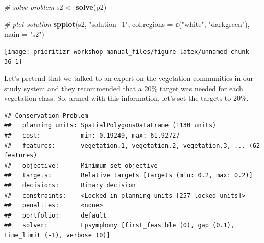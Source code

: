 \documentclass[12pt,]{book}
\newenvironment{Shaded}{\begin{snugshade}}{\end{snugshade}}
\newcommand{\KeywordTok}[1]{\textcolor[rgb]{0.13,0.29,0.53}{\textbf{#1}}}
\newcommand{\DataTypeTok}[1]{\textcolor[rgb]{0.13,0.29,0.53}{#1}}
\newcommand{\FloatTok}[1]{\textcolor[rgb]{0.00,0.00,0.81}{#1}}
\newcommand{\StringTok}[1]{\textcolor[rgb]{0.31,0.60,0.02}{#1}}
\newcommand{\CommentTok}[1]{\textcolor[rgb]{0.56,0.35,0.01}{\textit{#1}}}
\newcommand{\OtherTok}[1]{\textcolor[rgb]{0.56,0.35,0.01}{#1}}
\newcommand{\OperatorTok}[1]{\textcolor[rgb]{0.81,0.36,0.00}{\textbf{#1}}}
\newcommand{\NormalTok}[1]{#1}
\begin{document}
\begin{Shaded}
\begin{Highlighting}[]
\CommentTok{# solve problem}
\NormalTok{s2 <-}\StringTok{ }\KeywordTok{solve}\NormalTok{(p2)}

\CommentTok{# plot solution}
\KeywordTok{spplot}\NormalTok{(s2, }\StringTok{"solution_1"}\NormalTok{, }\DataTypeTok{col.regions =} \KeywordTok{c}\NormalTok{(}\StringTok{"white"}\NormalTok{, }\StringTok{"darkgreen"}\NormalTok{), }\DataTypeTok{main =} \StringTok{"s2"}\NormalTok{)}
\end{Highlighting}
\end{Shaded}

\begin{center}\texttt{[image: prioritizr-workshop-manual\_files/figure-latex/unnamed-chunk-36-1]} \end{center}

Let's pretend that we talked to an expert on the vegetation communities
in our study system and they recommended that a 20\% target was needed
for each vegetation class. So, armed with this information, let's set
the targets to 20\%.

\begin{Shaded}
\end{Shaded}

\begin{verbatim}
## Conservation Problem
##   planning units: SpatialPolygonsDataFrame (1130 units)
##   cost:           min: 0.19249, max: 61.92727
##   features:       vegetation.1, vegetation.2, vegetation.3, ... (62 features)
##   objective:      Minimum set objective 
##   targets:        Relative targets [targets (min: 0.2, max: 0.2)]
##   decisions:      Binary decision 
##   constraints:    <Locked in planning units [257 locked units]>
##   penalties:      <none>
##   portfolio:      default
##   solver:         Lpsymphony [first_feasible (0), gap (0.1), time_limit (-1), verbose (0)]
\end{verbatim}
\end{document}

